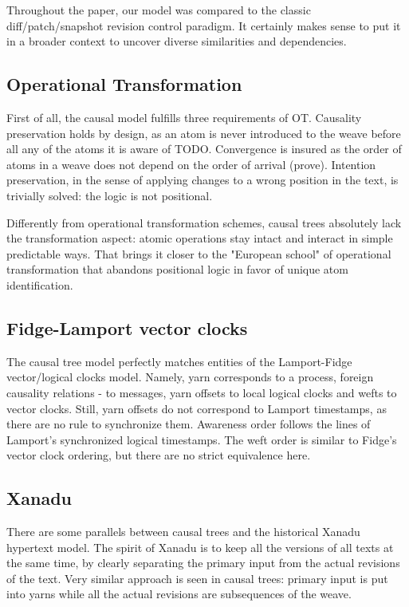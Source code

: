 \documentclass{acm_proc_article-sp}
\begin{document}
Throughout the paper, our model was compared to the classic
diff/patch/snapshot revision control paradigm. It certainly makes
sense to put it in a broader context to uncover diverse
similarities and dependencies.

\subsection{Operational Transformation}

First of all, the causal model fulfills three requirements of OT.
Causality preservation holds
by design, as an atom is never introduced to the weave before all
any of the atoms it is aware of TODO.
Convergence is insured as the order of atoms in a weave does
not depend on the order of arrival (prove). Intention
preservation, in the sense of applying changes to a wrong position
in the text, is trivially solved: the logic is not positional.

Differently from operational transformation schemes, causal trees
absolutely lack the transformation aspect: atomic operations
stay intact and interact in simple predictable ways. That brings
it closer to the "European school" of operational transformation
that abandons positional logic in favor of unique atom
identification.

\subsection{Fidge-Lamport vector clocks}

The causal tree model perfectly matches entities of the
Lamport-Fidge vector/logical clocks model. Namely, yarn
corresponds to a process, foreign causality relations - to
messages, yarn offsets to local logical clocks and wefts to
vector clocks. Still, yarn offsets do not correspond to Lamport
timestamps, as there are no rule to synchronize them.
Awareness order follows the lines of Lamport's synchronized
logical timestamps. The weft order is similar to Fidge's vector
clock ordering, but there are no strict equivalence here.

\subsection{Xanadu}

There are some parallels between causal trees and the historical
Xanadu hypertext model. The spirit of Xanadu is to keep all the
versions of all texts at the same time, by clearly separating the
primary input from the actual revisions of the text. Very similar 
approach is seen in causal trees: primary input is put into yarns
while all the actual revisions are subsequences of the weave.
\end{document}
